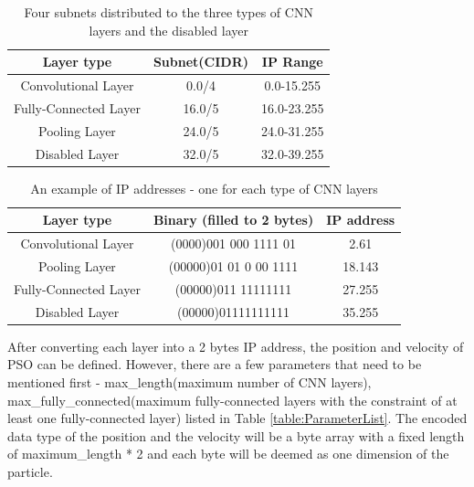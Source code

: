 \documentclass[conference]{IEEEtran}
\begin{document}
\begin{table}[!t]
	\renewcommand{\arraystretch}{1.3}
	\caption{Four subnets distributed to the three types of CNN layers and the disabled layer}
	\label{table:Subnets}
	\centering
	\begin{tabular}{|c|c|c|}
		\hline
		Layer type & Subnet(CIDR) & IP Range\\
		\hline
		Convolutional Layer & 0.0/4 & 0.0-15.255\\
		\hline
		Fully-Connected Layer & 16.0/5 & 16.0-23.255\\
		\hline
		Pooling Layer & 24.0/5 & 24.0-31.255\\
		\hline
		Disabled Layer & 32.0/5 & 32.0-39.255\\
		\hline
	\end{tabular}
\end{table}

\begin{table}[!t]
	\renewcommand{\arraystretch}{1.3}
	\caption{An example of IP addresses - one for each type of CNN layers}
	\label{table:IPExample}
	\centering
	\begin{tabular}{|c|c|c|}
		\hline
		Layer type & Binary (filled to 2 bytes) & IP address\\
		\hline
		Convolutional Layer & (0000)001 000 1111 01 & 2.61\\
		\hline
		Pooling Layer & (00000)01 01 0 00 1111 & 18.143\\
		\hline
		Fully-Connected Layer & (00000)011 11111111 & 27.255\\
		\hline
		Disabled Layer & (00000)01111111111 & 35.255\\
		\hline
	\end{tabular}
\end{table}


After converting each layer into a 2 bytes IP address, the position and velocity of PSO can be defined. However, there are a few parameters that need to be mentioned first - max\_length(maximum number of CNN layers), max\_fully\_connected(maximum fully-connected layers with the constraint of at least one fully-connected layer) listed in Table \ref{table:ParameterList}. The encoded data type of the position and the velocity will be a byte array with a fixed length of maximum\_length * 2 and each byte will be deemed as one dimension of the particle.
\end{document}
